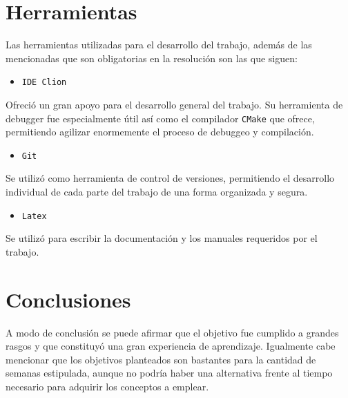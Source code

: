 \documentclass[a4paper]{article}
\begin{document}
\section{Herramientas}

Las herramientas utilizadas para el desarrollo del trabajo, además de las mencionadas que son obligatorias en la resolución son las que siguen:

\begin{itemize}
	\item \texttt{IDE Clion}
\end{itemize}

Ofreció un gran apoyo para el desarrollo general del trabajo. Su herramienta de debugger fue especialmente útil así como el compilador \texttt{CMake} que ofrece, permitiendo agilizar enormemente el proceso de debuggeo y compilación.

\begin{itemize}
	\item \texttt{Git}
\end{itemize}

Se utilizó como herramienta de control de versiones, permitiendo el desarrollo individual de cada parte del trabajo de una forma organizada y segura.

\begin{itemize}
	\item \texttt{Latex} 
\end{itemize} 

Se utilizó para escribir la documentación y los manuales requeridos por el trabajo.

\section{Conclusiones}

A modo de conclusión se puede afirmar que el objetivo fue cumplido a grandes rasgos y que constituyó una gran experiencia de aprendizaje. Igualmente cabe mencionar que los objetivos planteados son bastantes para la cantidad de semanas estipulada, aunque no podría haber una alternativa frente al tiempo necesario para adquirir los conceptos a emplear.
\end{document}
